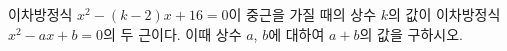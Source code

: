 이차방정식 $x^2-(k-2)x+16=0$이 중근을 가질 때의 상수 $k$의 값이 이차방정식 $x^2-ax+b=0$의 두 근이다. 이때 상수 $a$, $b$에 대하여 $a+b$의 값을 구하시오.
